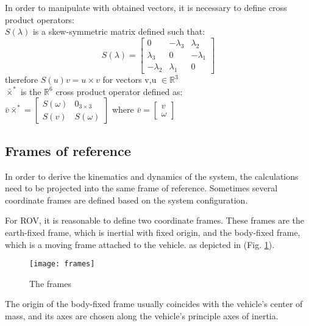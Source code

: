    In order to manipulate with obtained vectors, it is necessary to define cross product operators:\\
    $S(\lambda)$ is a skew-symmetric matrix defined such that:
    $$
    S(\lambda)=\left[\begin{array}{ccc}
        0 & -\lambda_3 & \lambda_2 \\
        \lambda_3 & 0 & -\lambda_1 \\
        -\lambda_2 & \lambda_1 & 0
    \end{array}\right]
    $$ therefore $S(u)v = u \times v$ for vectors v,u $\in \mathbb{R}^{3}$ \\
    $\bar{\times}^*$ is the $\mathbb{R}^{6}$ cross product operator defined as: \\
    
    $
    \bar{v}\bar{\times}^*=\left[\begin{array}{ll}
        S(\omega) & 0_{3 \times 3} \\
        S(v) & S(\omega)
    \end{array}\right]
    $ where $\bar{v} = \left[\begin{array}{ll}
        v \\
        \omega
    \end{array}\right]$

\subsection{Frames of reference}

    In order to derive the kinematics and dynamics of the system, the calculations need to be projected into 
    the same frame of reference. 
    Sometimes several coordinate frames are defined based on the system configuration. 
    
    For ROV, it is reasonable to define two coordinate frames. 
    These frames are the earth-fixed frame, which is inertial with fixed origin, and the body-fixed frame, 
    which is a moving frame attached to the vehicle. as depicted in (Fig. \ref{image:frames}). 
    \begin{figure}[H]
        \centering\texttt{[image: frames]}
        \caption{The frames}
        \label{image:frames}
    \end{figure}

    The origin of the body-fixed frame usually coincides with the vehicle's center of mass,
     and its axes are chosen along the vehicle's principle axes of inertia.

